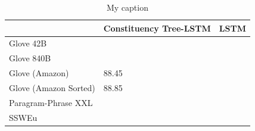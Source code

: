 \begin{table}[]
	\centering
	\caption{My caption}
	\label{my-label}
	\begin{tabular}{@{}lll@{}}
		\toprule
		& Constituency Tree-LSTM & LSTM \\ \midrule
		Glove 42B             &                        &      \\
		Glove 840B            &                        &      \\
		Glove (Amazon)        &  88.45           &      \\
		Glove (Amazon Sorted) &  88.85           &      \\
		Paragram-Phrase XXL   &                        &      \\
		SSWEu                 &                        &      \\ \bottomrule
	\end{tabular}
\end{table}
